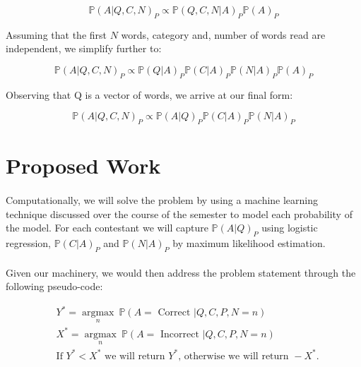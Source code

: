\documentclass[letterpaper]{article}
\DeclareMathOperator{\argmax}{argmax}
\newcommand{\Prob}[1]{\mathbb{P}\left( #1 \right)}
\begin{document}
\begin{equation*}
\Prob{A \lvert Q, C, N}_P \propto \Prob{Q, C, N \lvert A}_P \Prob{A}_P
\end{equation*}

Assuming that the first $N$ words, category and, number of words read are independent, we simplify further to:

\begin{equation*}
\Prob{A \lvert Q, C, N}_P \propto \Prob{Q\lvert A}_P \Prob{C \lvert A}_P \Prob{N \lvert A}_P \Prob{A}_P
\end{equation*}

Observing that Q is a vector of words, we arrive at our final form:


\begin{equation*}
\Prob{A \lvert Q, C, N}_P \propto \Prob{A \lvert Q}_P \Prob{C \lvert A}_P \Prob{N \lvert A}_P
\end{equation*}

\section*{Proposed Work}

\paragraph{} Computationally, we will solve the problem by using a machine learning technique discussed over the course of the semester to model each probability of the model.  For each contestant we will capture $\Prob{A \lvert Q}_P$ using logistic regression, $\Prob{C \lvert A}_P$ and $\Prob{N \lvert A}_P$ by maximum likelihood estimation.

\paragraph{} Given our machinery, we would then address the problem statement through the following pseudo-code:

\begin{equation*}
\begin{split}
& Y^* = \underset{n}{\argmax} \ \Prob{A = \text{ Correct } \lvert Q, C, P, N = n} \\
& X^* = \underset{n}{\argmax} \ \Prob{A = \text{ Incorrect } \lvert Q, C, P, N = n} \\
& \text{If } Y^* < X^* \text{ we will return } Y^* \text{, otherwise we will return } -X^*.
\end{split}
\end{equation*}
\end{document}
